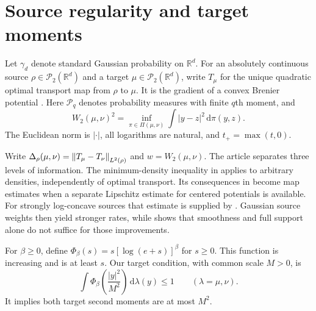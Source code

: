 \documentclass[11pt]{article}
\numberwithin{equation}{section}
\theoremstyle{remark}\newtheorem{remark}[theorem]{Remark}
\newcommand{\R}{\mathbb R}\newcommand{\E}{\mathbb E}
\newcommand{\Prob}{\mathcal P}\newcommand{\dd}{\,\mathrm d}
\begin{document}
\section{Source regularity and target moments}\label{sec:statements}
Let $\gamma_d$ denote standard Gaussian probability on $\R^d$. For an absolutely continuous source $\rho\in\Prob_2(\R^d)$ and a target $\mu\in\Prob_2(\R^d)$, write $T_\mu$ for the unique quadratic optimal transport map from $\rho$ to $\mu$. It is the gradient of a convex Brenier potential \cite{Brenier1991}. Here $\Prob_q$ denotes probability measures with finite $q$th moment, and
\[
 W_2(\mu,\nu)^2=\inf_{\pi\in\Pi(\mu,\nu)}\int|y-z|^2\dd\pi(y,z).
\]
The Euclidean norm is $|\cdot|$, all logarithms are natural, and $t_+=\max(t,0)$.

Write $\Delta_\rho(\mu,\nu)=\left\lVert T_\mu-T_\nu\right\rVert_{L^2(\rho)}$ and $w=W_2(\mu,\nu)$. The article separates three levels of information. The minimum-density inequality in  applies to arbitrary densities, independently of optimal transport. Its consequences in  become map estimates when a separate Lipschitz estimate for centered potentials is available. For strongly log-concave sources that estimate is supplied by . Gaussian source weights then yield stronger rates, while  shows that smoothness and full support alone do not suffice for those improvements.

For $\beta\ge0$, define $\Phi_\beta(s)=s[\log(e+s)]^\beta$ for $s\ge0$. This function is increasing and is at least $s$. Our target condition, with common scale $M>0$, is
\begin{equation}\label{eq:log-class}
 \int\Phi_\beta\left(\frac{|y|^2}{M^2}\right)\dd\lambda(y)\le1
 \qquad(\lambda=\mu,\nu).
\end{equation}
It implies both target second moments are at most $M^2$.
\end{document}

